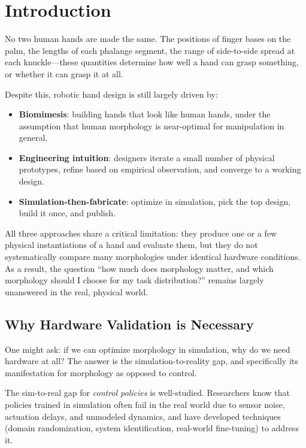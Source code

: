 \documentclass[journal]{IEEEtran}
\begin{document}
\section{Introduction}
\label{sec:intro}

No two human hands are made the same.
The positions of finger bases on the palm, the lengths of each phalange segment, the range
of side-to-side spread at each knuckle---these quantities determine how well a hand can grasp something, or whether it can grasp it at all.

Despite this, robotic hand design is still largely driven by:
\begin{itemize}
  \item \textbf{Biomimesis}: building hands that look like human hands, under the assumption
    that human morphology is near-optimal for manipulation in general.
  \item \textbf{Engineering intuition}: designers iterate a small number of physical
    prototypes, refine based on empirical observation, and converge to a working design.
  \item \textbf{Simulation-then-fabricate}: optimize in simulation, pick the top design,
    build it once, and publish.
\end{itemize}
All three approaches share a critical limitation: they produce one or a few physical
instantiations of a hand and evaluate them, but they do not systematically compare many
morphologies under identical hardware conditions.
As a result, the question ``how much does morphology matter, and which morphology should
I choose for my task distribution?'' remains largely unanswered in the real, physical world.

\subsection{Why Hardware Validation is Necessary}

One might ask: if we can optimize morphology in simulation, why do we need hardware at all?
The answer is the simulation-to-reality gap, and specifically its manifestation for
morphology as opposed to control.

The sim-to-real gap for \emph{control policies} is well-studied.
Researchers know that policies trained in simulation often fail in the real world due to
sensor noise, actuation delays, and unmodeled dynamics, and have developed techniques
(domain randomization, system identification, real-world fine-tuning) to address it.
\end{document}
